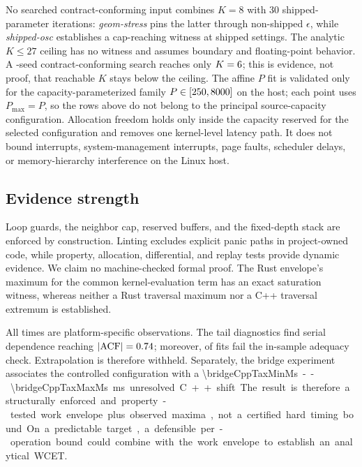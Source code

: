 No searched contract-conforming input combines $K=8$ with 30 shipped-parameter iterations:
\emph{geom-stress} pins the latter through non-shipped $\epsilon$, while
\emph{shipped-osc} establishes a cap-reaching witness at shipped settings. The analytic $K\le27$
ceiling has no witness and assumes boundary and floating-point behavior. A
\legalKSearchSeeds{}-seed contract-conforming search reaches only
$K=6$; this is evidence, not proof, that reachable $K$ stays below the
ceiling. The affine $P$ fit is validated only for the capacity-parameterized family
$P\in[\num{250}{},\num{8000}{}]$ on the host; each point uses $P_{\max}=P$, so the
rows above \runtimePMax{} do not belong to the principal source-capacity configuration.
Allocation freedom holds only inside the capacity reserved for the selected configuration and
removes one kernel-level latency path. It does not bound interrupts, system-management
interrupts, page faults, scheduler delays,
or memory-hierarchy interference on the Linux host.

\subsection{Evidence strength}
\label{sec:threats-epistemic}
Loop guards, the neighbor cap, reserved buffers, and the fixed-depth stack are enforced by
construction. Linting excludes explicit panic paths in project-owned code, while property,
allocation, differential, and replay tests provide dynamic evidence. We claim no
machine-checked formal proof. The Rust envelope's maximum for the common
kernel-evaluation term has an exact saturation witness, whereas neither a Rust traversal
maximum nor a C++ traversal extremum is established.

All times are platform-specific observations. The tail diagnostics find serial dependence
reaching $|\mathrm{ACF}|=0.74$; moreover, \evtFitFailures{} of
\evtFitChecks{} fits fail the in-sample adequacy check. Extrapolation is therefore
withheld. Separately, the
bridge experiment associates
the controlled configuration with a \SI{\bridgeCppTaxMinMs}--\SI{\bridgeCppTaxMaxMs}{ms}
unresolved C++ shift. The result is therefore a structurally enforced and property-tested
work envelope plus observed maxima, not a certified hard timing bound. On a predictable
target, a defensible per-operation bound could combine with the work envelope to establish
an analytical WCET.
